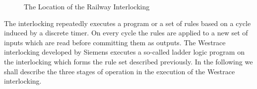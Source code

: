 \begin{figure}[h!]

\begin{center}
\end{center}

\caption{The Location of the Railway Interlocking}
\label{fig:trackstate}
\end{figure}

The interlocking repeatedly executes a program or a set of rules based on a cycle induced by a discrete timer. On every cycle the rules are applied to a new set of inputs which are read  before committing them as outputs. The Westrace interlocking developed by Siemens executes a so-called ladder logic program on the interlocking which forms the rule set described previously.  In the following we shall describe the three stages of operation in the execution of the Westrace interlocking.


\begin{comment}
The railway interlocking repeatedly executes a program or set of rules over some discrete time
interval. Each time it uses the set of
rules it contains to process a new set of inputs before committing them as
outputs. The Westrace interlocking used by Invensys Rail executes a so-called
ladder logic program to perform this process. 
The following are the three main stages of operation in the running of an
Westrace interlocking.
\end{comment}


